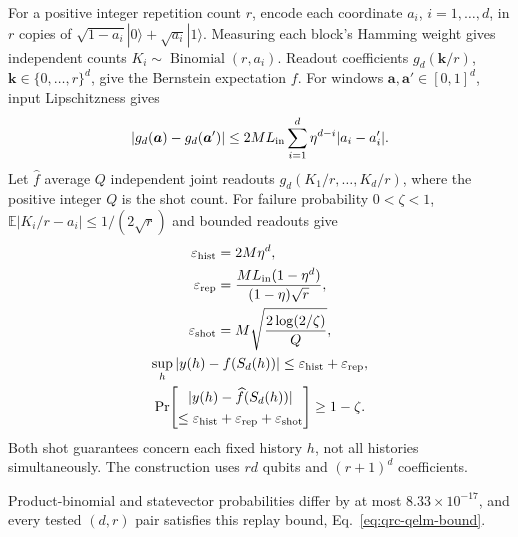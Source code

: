 For a positive integer repetition count $r$, encode each coordinate $a_i$,
$i=1,\ldots,d$, in $r$ copies of
$\sqrt{1-a_i}|0\rangle+\sqrt{a_i}|1\rangle$. Measuring each block's Hamming
weight gives independent counts $K_i\sim\operatorname{Binomial}(r,a_i)$.
Readout coefficients $g_d(\boldsymbol k/r)$, $\boldsymbol k\in\{0,\ldots,r\}^d$,
give the Bernstein expectation $f$.
For windows $\boldsymbol a,\boldsymbol a'\in[0,1]^d$, input Lipschitzness gives
\begin{equation}
 |g_d(\boldsymbol a)-g_d(\boldsymbol a')|
 \leq2ML_{\rm in}\sum_{i=1}^d\eta^{d-i}|a_i-a_i'|.
\end{equation}
Let $\widehat f$ average $Q$ independent joint readouts
$g_d(K_1/r,\ldots,K_d/r)$, where the positive integer $Q$ is the shot count.
For failure probability $0<\zeta<1$,
$\mathbb E|K_i/r-a_i|\leq1/(2\sqrt r)$ and bounded readouts give \cite{hoeffding1963probability}
\begin{equation}
 \begin{gathered}
 \begin{aligned}
 \varepsilon_{\rm hist}&=2M\eta^d,\\
 \varepsilon_{\rm rep}&=\frac{ML_{\rm in}(1-\eta^d)}{(1-\eta)\sqrt r},\\
 \varepsilon_{\rm shot}&=M\sqrt{\frac{2\log(2/\zeta)}{Q}},
 \end{aligned}\\
 \sup_h|y(h)-f(S_d(h))|
 \leq\varepsilon_{\rm hist}+\varepsilon_{\rm rep},\\
 \Pr\!\left[
 \begin{gathered}
 |y(h)-\widehat f(S_d(h))|\\
 \leq\varepsilon_{\rm hist}+\varepsilon_{\rm rep}+\varepsilon_{\rm shot}
 \end{gathered}
 \right]\geq1-\zeta .
 \end{gathered}
 \label{eq:qrc-qelm-bound}
\end{equation}
Both shot guarantees concern each fixed history $h$, not all histories
simultaneously. The construction uses $rd$ qubits and $(r+1)^d$ coefficients.

Product-binomial and statevector probabilities differ by at most
$8.33\times10^{-17}$, and every tested $(d,r)$ pair satisfies
this replay bound, Eq.~\eqref{eq:qrc-qelm-bound}.

